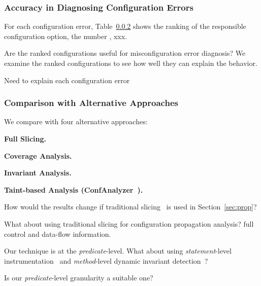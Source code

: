 \subsubsection{Accuracy in Diagnosing Configuration Errors}

For each configuration error, Table~\ref{} shows the ranking of the
responsible configuration option, the number , xxx.


Are the ranked configurations useful for misconfiguration error diagnosis?
We examine the ranked configurations to see how well they can explain the behavior.


Need to explain each configuration error


\subsubsection{Comparison with Alternative Approaches}

We compare \ourtool with four alternative approaches:

\noindent \textbf{Full Slicing.}

\noindent \textbf{Coverage Analysis.}

\noindent \textbf{Invariant Analysis.}

\noindent \textbf{Taint-based Analysis (ConfAnalyzer~\cite{Rabkin:2011:PPC}).}

How would the results change if traditional slicing~\cite{Horwitz:1988} is used
in Section~\ref{sec:prop}?

What about using traditional slicing for configuration propagation analysis?
full control and data-flow information.



Our technique is at the \textit{predicate}-level. What about using
\textit{statement}-level instrumentation~\cite{Jones:2002}
 and \textit{method}-level dynamic invariant detection~\cite{Ernst:1999}?

Is our \textit{predicate}-level granularity a suitable one?

